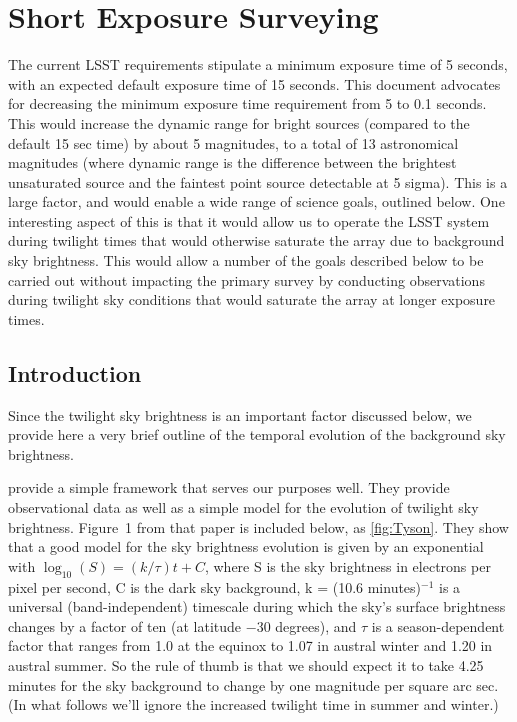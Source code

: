 %
%
%

\section{Short Exposure Surveying}
\def\secname{shortexp}\label{sec:\secname}


The current LSST requirements stipulate a minimum exposure time of 5
seconds, with an expected default exposure time of 15 seconds. This
document advocates for decreasing the minimum exposure time requirement
from 5 to 0.1 seconds. This would increase the dynamic range for bright
sources (compared to the default 15 sec time) by about 5 magnitudes, to
a total of 13 astronomical magnitudes (where dynamic range is the
difference between the brightest unsaturated source and the faintest
point source detectable at 5 sigma). This is a large factor, and would
enable a wide range of science goals, outlined below. One interesting
aspect of this is that it would allow us to operate the LSST system
during twilight times that would otherwise saturate the array due to
background sky brightness. This would allow a number of the goals
described below to be carried out without impacting the primary survey
by conducting observations during twilight sky conditions that would
saturate the array at longer exposure times.



\subsection{Introduction}
\label{sec:\secname:intro}

Since the twilight sky brightness is an important factor discussed
below, we provide here a very brief outline of the temporal evolution of
the background sky brightness.

\citet{1993AJ....105.1206T}
provide a simple framework that serves our purposes well. They provide
observational data as well as a simple model for the evolution of
twilight sky brightness. Figure~1 from that paper is included below, as \autoref{fig:Tyson}.
They show that a good model for the sky brightness evolution is given by
an exponential with
$\log_{10}(S)=(k/\tau)t+C$,
where S is the sky brightness in electrons per pixel per second, C is
the dark sky background, k = (10.6 minutes)$^{-1}$  is a universal
(band-independent) timescale during which the sky's surface brightness
changes by a factor of ten (at latitude $-$30 degrees), and $\tau$ is a
season-dependent factor that ranges from 1.0 at the equinox to 1.07 in
austral winter and 1.20 in austral summer. So the rule of thumb is that
we should expect it to take 4.25 minutes for the sky background to
change by one magnitude per square arc sec. (In what follows we'll
ignore the increased twilight time in summer and winter.)

